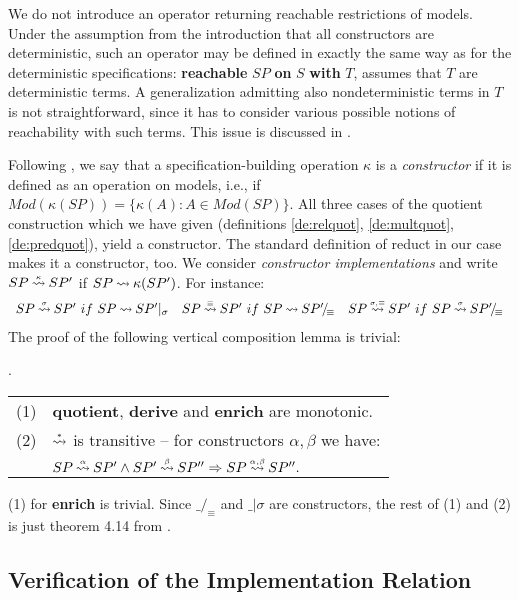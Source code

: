 We do not introduce an operator returning reachable restrictions of models. Under the assumption from the introduction that all constructors are deterministic, such an operator may be defined in exactly the same way as for the deterministic specifications: {\bf reachable} $SP$ {\bf on} $S$ {\bf with} $T$, assumes that $T$ are deterministic terms. A generalization admitting also nondeterministic terms in $T$ is not straightforward, since it has to consider various possible notions of reachability with such terms. This issue is discussed in \cite{taps}.

Following \cite{ST}, we say that a specification-building operation $\kappa$ is
a {\em constructor} if it is defined as an operation on models, i.e., if $Mod(\kappa(SP)) = \{\kappa(A):A\in Mod(SP)\}$. All three cases of the quotient construction which we have given (definitions \ref{de:relquot}, \ref{de:multquot}, \ref{de:predquot}), yield a constructor. The standard definition of reduct in our case makes it a constructor, too. We consider 
{\em constructor
implementations} and write $SP\mathbin{\stackrel{\scriptscriptstyle \kappa}{\mathbin{\leadsto}}}SP'$ if $SP\mathbin{\leadsto} \kappa(SP')$. For instance:
\[\begin{array}{ccc}
SP\imm{\sigma} SP'\ if\ SP\im SP'|_\sigma & SP\imm{\equiv} SP'\ if\ SP \im \quot{SP'}\equiv & SP\imm{\sigma,\equiv} SP'\ if\ SP\imm{\sigma} \quot{SP'}\equiv \end{array} \]
\noindent
The proof of the following vertical composition lemma is trivial: 

\begin{LEMMA}\label{le:trans}. \begin{tabular}[t]{ll} (1) & {\bf quotient}, {\bf derive} and {\bf enrich} are monotonic. \\ (2) & $\mathbin{\stackrel{\scriptscriptstyle *}{\mathbin{\leadsto}}}$ is transitive -- for constructors $\alpha, \beta $ we have:\\ 
& $ SP\mathbin{\stackrel{\scriptscriptstyle \alpha}{\mathbin{\leadsto}}}SP'\land
SP'\mathbin{\stackrel{\scriptscriptstyle \beta}{\mathbin{\leadsto}}}SP''\mathrel\Rightarrow SP\mathbin{\stackrel{\scriptscriptstyle \alpha,\beta}{\mathbin{\leadsto}}}SP''.$ \end{tabular}
\end{LEMMA}
\begin{PROOF} (1) for {\bf enrich} is trivial. Since $\_/_\equiv$ and $\_|\sigma$ are
constructors, the rest of (1) and (2) is just theorem 4.14 from \cite{ST}. \end{PROOF}



\subsection{Verification of the Implementation Relation} 


